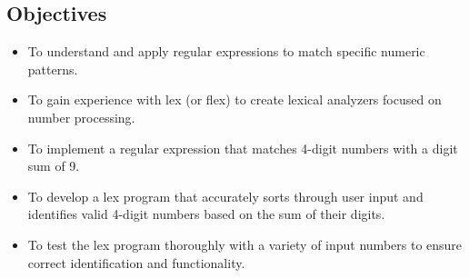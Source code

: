 \documentclass[12pt]{article}
\begin{document}
\subsection*{Objectives}
\begin{itemize}
    \item To understand and apply regular expressions to match specific numeric patterns.
    \item To gain experience with lex (or flex) to create lexical analyzers focused on number processing.
    \item To implement a regular expression that matches 4-digit numbers with a digit sum of 9.
    \item To develop a lex program that accurately sorts through user input and identifies valid 4-digit numbers based on the sum of their digits.
    \item To test the lex program thoroughly with a variety of input numbers to ensure correct identification and functionality.
\end{itemize}
\end{document}
